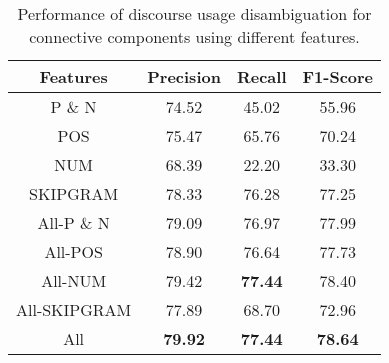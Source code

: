 \begin{table}[ht]
\centering
\begin{tabular}{|c|c|c|c|}
\hline

\bf Features        & \bf Precision & \bf Recall & \bf F1-Score \\ \hline
    P \& N          &     74.52     &     45.02  &     55.96    \\ \hline
    POS             &     75.47     &     65.76  &     70.24    \\ \hline
    NUM             &     68.39     &     22.20  &     33.30    \\ \hline
    SKIPGRAM        &     78.33     &     76.28  &     77.25    \\ \hline
    All-P \& N      &     79.09     &     76.97  &     77.99    \\ \hline
    All-POS         &     78.90     &     76.64  &     77.73    \\ \hline
    All-NUM         &     79.42     & \bf 77.44  &     78.40    \\ \hline
    All-SKIPGRAM    &     77.89     &     68.70  &     72.96    \\ \hline
    All             & \bf 79.92     & \bf 77.44  & \bf 78.64    \\ \hline


\end{tabular}
\caption{\label{t:recognition-features} Performance of discourse usage
disambiguation for connective components using different features. }
\end{table}
